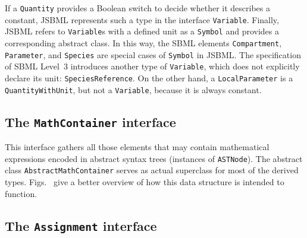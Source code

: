 If a \texttt{Quantity} provides a Boolean
%
switch to decide whether it describes a constant,
%
JSBML represents such a type in the interface \texttt{Variable}.
%
Finally, JSBML refers to \texttt{Variable}s with a defined unit as a
\texttt{Symbol}
%
and provides a corresponding abstract class. In this way, the
SBML elements \texttt{Compartment}, \texttt{Parameter}, and \texttt{Species}
%
%
%
are special cases of \texttt{Symbol} in JSBML. The specification of SBML Level~3
%
introduces another type of \texttt{Variable}, which does not explicitly declare
its unit: \texttt{SpeciesReference}. On the other hand, a
\texttt{LocalParameter}
%
is a \texttt{QuantityWithUnit},
%
but not a \texttt{Variable}, because it is always constant.
%


\subsection{The \texttt{MathContainer} interface}

This interface gathers all those elements that may contain mathematical
expressions encoded in abstract syntax trees (instances of
\texttt{ASTNode}).
The abstract class \texttt{AbstractMathContainer}
%
serves as actual superclass
for most of the derived types.
Figs.~ give a better
overview of how this data structure is intended to function.


\subsection{The \texttt{Assignment} interface}

